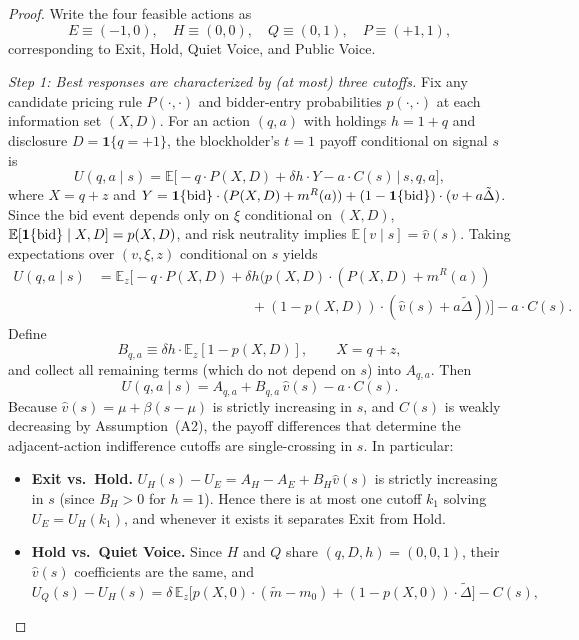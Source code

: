\documentclass[11pt]{article}
\newcommand{\E}{\mathbb{E}}
\newcommand{\1}{\mathbf{1}}
\begin{document}
\begin{proof}
Write the four feasible actions as
\[
E\equiv(-1,0),\quad H\equiv(0,0),\quad Q\equiv(0,1),\quad P\equiv(+1,1),
\]
corresponding to Exit, Hold, Quiet Voice, and Public Voice.

\textit{Step 1: Best responses are characterized by (at most) three cutoffs.}
Fix any candidate pricing rule $P(\cdot,\cdot)$ and bidder-entry probabilities $p(\cdot,\cdot)$ at each information set $(X,D)$. For an action $(q,a)$ with holdings $h=1+q$ and disclosure $D=\1\{q=+1\}$, the blockholder's $t=1$ payoff conditional on signal $s$ is
\[
U(q,a \mid s)
= \E\Big[-q\cdot P(X,D) + \delta h \cdot Y - a\cdot C(s) \,\Big|\, s,q,a\Big],
\]
where $X=q+z$ and $Y=\1\{\textup{bid}\}\cdot (P(X,D)+m^{R}(a)) + (1-\1\{\textup{bid}\})\cdot (v+a\tilde{\Delta})$.
Since the bid event depends only on $\xi$ conditional on $(X,D)$, $\E[\1\{\textup{bid}\} \mid X,D]=p(X,D)$, and risk neutrality implies $\E[v \mid s]=\hat v(s)$. Taking expectations over $(v,\xi,z)$ conditional on $s$ yields
\begin{align*}
U(q,a \mid s)
&= \E_z\Big[-q\cdot P(X,D) + \delta h \big(p(X,D)\cdot (P(X,D)+m^{R}(a)) \\
&\qquad\qquad\qquad\qquad\qquad\quad + (1-p(X,D))\cdot(\hat{v}(s)+a\tilde{\Delta})\big)\Big] - a\cdot C(s).
\end{align*}
Define
\[
B_{q,a}\equiv \delta h\cdot \E_z[1-p(X,D)],\qquad X=q+z,
\]
and collect all remaining terms (which do not depend on $s$) into $A_{q,a}$. Then
\begin{equation}
U(q,a \mid s)=A_{q,a}+B_{q,a}\,\hat{v}(s)-a\cdot C(s).
\label{eq:U-affine}
\end{equation}
Because $\hat v(s)=\mu+\beta(s-\mu)$ is strictly increasing in $s$, and $C(s)$ is weakly decreasing by Assumption~\textup{(A2)}, the payoff differences that determine the adjacent-action indifference cutoffs are single-crossing in $s$. In particular:
\begin{itemize}[leftmargin=1.5em,itemsep=2pt]
\item \textbf{Exit vs.\ Hold.} $U_H(s)-U_E=A_{H}-A_{E}+B_{H}\hat v(s)$ is strictly increasing in $s$ (since $B_H>0$ for $h=1$). Hence there is at most one cutoff $k_1$ solving $U_E=U_H(k_1)$, and whenever it exists it separates Exit from Hold.
\item \textbf{Hold vs.\ Quiet Voice.} Since $H$ and $Q$ share $(q,D,h)=(0,0,1)$, their $\hat v(s)$ coefficients are the same, and
\begin{equation}
U_Q(s)-U_H(s)=\delta\,\E_z\!\Big[p(X,0)\cdot(\tilde m-m_0)+(1-p(X,0))\cdot\tilde\Delta\Big]-C(s),

\end{equation}
\end{itemize}
\end{proof}
\end{document}
